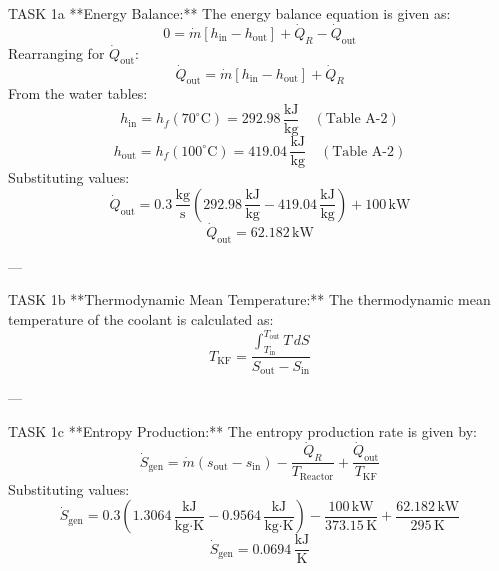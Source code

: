 TASK 1a  
**Energy Balance:**  
The energy balance equation is given as:  
\[
0 = \dot{m} \left[ h_{\text{in}} - h_{\text{out}} \right] + \dot{Q}_R - \dot{Q}_{\text{out}}
\]  
Rearranging for \(\dot{Q}_{\text{out}}\):  
\[
\dot{Q}_{\text{out}} = \dot{m} \left[ h_{\text{in}} - h_{\text{out}} \right] + \dot{Q}_R
\]  
From the water tables:  
\[
h_{\text{in}} = h_f(70^\circ\text{C}) = 292.98 \, \frac{\text{kJ}}{\text{kg}} \quad (\text{Table A-2})
\]  
\[
h_{\text{out}} = h_f(100^\circ\text{C}) = 419.04 \, \frac{\text{kJ}}{\text{kg}} \quad (\text{Table A-2})
\]  
Substituting values:  
\[
\dot{Q}_{\text{out}} = 0.3 \, \frac{\text{kg}}{\text{s}} \left( 292.98 \, \frac{\text{kJ}}{\text{kg}} - 419.04 \, \frac{\text{kJ}}{\text{kg}} \right) + 100 \, \text{kW}
\]  
\[
\dot{Q}_{\text{out}} = 62.182 \, \text{kW}
\]  

---

TASK 1b  
**Thermodynamic Mean Temperature:**  
The thermodynamic mean temperature of the coolant is calculated as:  
\[
T_{\text{KF}} = \frac{\int_{T_{\text{in}}}^{T_{\text{out}}} T \, dS}{S_{\text{out}} - S_{\text{in}}}
\]  

---

TASK 1c  
**Entropy Production:**  
The entropy production rate is given by:  
\[
\dot{S}_{\text{gen}} = \dot{m} \left( s_{\text{out}} - s_{\text{in}} \right) - \frac{\dot{Q}_R}{T_{\text{Reactor}}} + \frac{\dot{Q}_{\text{out}}}{T_{\text{KF}}}
\]  
Substituting values:  
\[
\dot{S}_{\text{gen}} = 0.3 \left( 1.3064 \, \frac{\text{kJ}}{\text{kg·K}} - 0.9564 \, \frac{\text{kJ}}{\text{kg·K}} \right) - \frac{100 \, \text{kW}}{373.15 \, \text{K}} + \frac{62.182 \, \text{kW}}{295 \, \text{K}}
\]  
\[
\dot{S}_{\text{gen}} = 0.0694 \, \frac{\text{kJ}}{\text{K}}
\]  